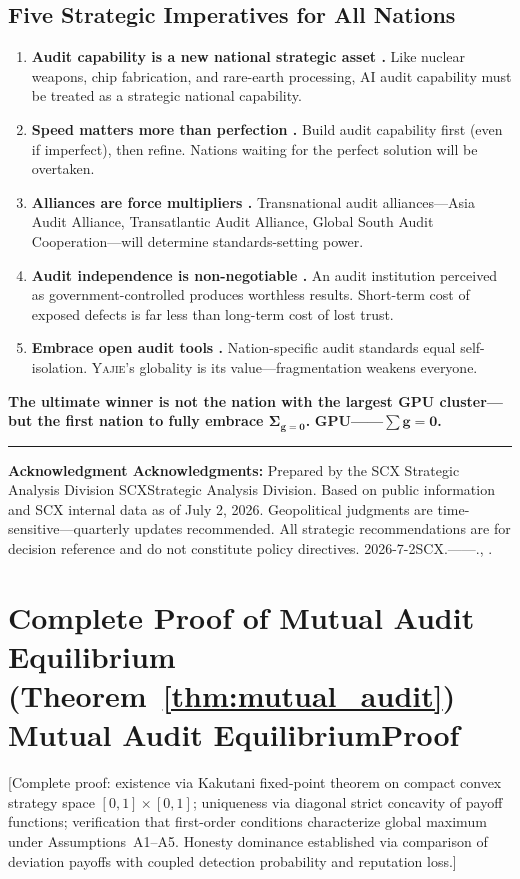 \documentclass[11pt,a4paper]{article}
\theoremstyle{definition}
\theoremstyle{remark}
\newcommand{\Yajie}{\textsc{Yajie}}
\newcommand{\sumGZero}{\Sigma_{g=0}}
\begin{document}
\subsection{Five Strategic Imperatives for All Nations}
\begin{enumerate}[label=(\arabic*)]
    \item \textbf{Audit capability is a new national strategic asset .} Like nuclear weapons, chip fabrication, and rare-earth processing, AI audit capability must be treated as a strategic national capability.
    \item \textbf{Speed matters more than perfection .} Build audit capability first (even if imperfect), then refine. Nations waiting for the perfect solution will be overtaken.
    \item \textbf{Alliances are force multipliers .} Transnational audit alliances---Asia Audit Alliance, Transatlantic Audit Alliance, Global South Audit Cooperation---will determine standards-setting power.
    \item \textbf{Audit independence is non-negotiable .} An audit institution perceived as government-controlled produces worthless results. Short-term cost of exposed defects is far less than long-term cost of lost trust.
    \item \textbf{Embrace open audit tools .} Nation-specific audit standards equal self-isolation. \Yajie{}'s globality is its value---fragmentation weakens everyone.
\end{enumerate}
\vspace{6pt}
\noindent\textbf{The ultimate winner is not the nation with the largest GPU cluster---but the first nation to fully embrace $\boldsymbol{\sumGZero}$.}
\vspace{6pt}
\noindent\textbf{GPU——$\boldsymbol{\sum g = 0}$.}
\vspace{12pt}
\noindent\rule{\textwidth}{0.4pt}
\vspace{6pt}
\noindent\textbf{Acknowledgment Acknowledgments:} Prepared by the SCX Strategic Analysis Division SCXStrategic Analysis Division. Based on public information and SCX internal data as of July 2, 2026. Geopolitical judgments are time-sensitive---quarterly updates recommended. All strategic recommendations are for decision reference and do not constitute policy directives. 2026-7-2SCX.——., .
\appendix
\section{Complete Proof of Mutual Audit Equilibrium (Theorem~\ref{thm:mutual_audit}) Mutual Audit EquilibriumProof}
\label{app:mutual_audit_proof}
[Complete proof: existence via Kakutani fixed-point theorem on compact convex strategy space $[0,1] \times [0,1]$; uniqueness via diagonal strict concavity of payoff functions; verification that first-order conditions characterize global maximum under Assumptions~A1--A5. Honesty dominance established via comparison of deviation payoffs with coupled detection probability and reputation loss.]
\end{document}

